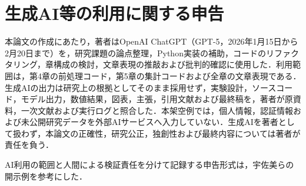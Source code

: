 \chapter*{生成AI等の利用に関する申告}

\UsamiFictionalExampleNotice
\par\vspace{1.5\baselineskip}

本論文の作成にあたり，著者はOpenAI ChatGPT（GPT-5，2026年1月15日から2月20日まで）を，研究課題の論点整理，Python実装の補助，コードのリファクタリング，章構成の検討，文章表現の推敲および批判的確認に使用した．利用範囲は，第4章の前処理コード，第5章の集計コードおよび全章の文章表現である．生成AIの出力は研究上の根拠としてそのまま採用せず，実験設計，ソースコード，モデル出力，数値結果，図表，主張，引用文献および最終稿を，著者が原資料，一次文献および実行ログと照合した．本架空例では，個人情報，認証情報および未公開研究データを外部AIサービスへ入力していない．生成AIを著者として扱わず，本論文の正確性，研究公正，独創性および最終内容については著者が責任を負う．

AI利用の範囲と人間による検証責任を分けて記録する申告形式は，宇佐美ら\cite{usami2026darkcurrent}の開示例を参考にした．

